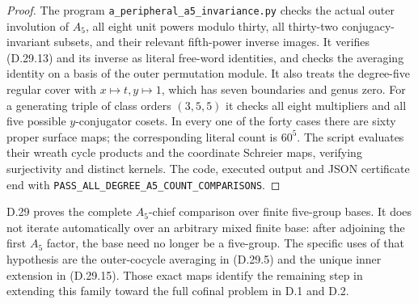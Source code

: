 \begin{proof}
The program \texttt{a\_peripheral\_a5\_invariance.py}
checks the actual outer involution of $A_5$,
all eight unit powers modulo thirty, all
thirty-two conjugacy-invariant subsets, and
their relevant fifth-power inverse images.
It verifies \textup{(D.29.13)} and its inverse
as literal free-word identities, and checks
the averaging identity on a basis of the
outer permutation module.
It also treats the degree-five regular cover
with $x\mapsto t,y\mapsto1$, which has seven
boundaries and genus zero.  For a generating
triple of class orders $(3,5,5)$ it checks
all eight multipliers and all five possible
$y$-conjugator cosets.  In every one of the
forty cases there are sixty proper surface
maps; the corresponding literal count is
$60^5$.  The script evaluates their wreath
cycle products and the coordinate Schreier
maps, verifying surjectivity and distinct
kernels.  The code, executed output and
JSON certificate end with
\texttt{PASS\_ALL\_DEGREE\_A5\_COUNT\_COMPARISONS}.
\end{proof}

D.29 proves the complete $A_5$-chief comparison
over finite five-group bases.  It does not
iterate automatically over an arbitrary
mixed finite base: after adjoining the
first $A_5$ factor, the base need no longer
be a five-group.  The specific uses of
that hypothesis are the outer-cocycle
averaging in \textup{(D.29.5)} and the
unique inner extension in
\textup{(D.29.15)}.  Those exact maps
identify the remaining step in extending
this family toward the full cofinal
problem in D.1 and D.2.
